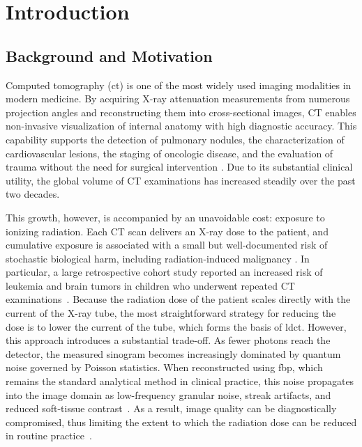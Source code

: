 \chapter{Introduction}
\label{chap:introduction}

\section{Background and Motivation}
\label{sec:intro_motivation}

Computed tomography (\gls{ct}) is one of the most widely used imaging modalities in modern medicine. By acquiring X-ray attenuation measurements from numerous projection angles and reconstructing them into cross-sectional images, CT enables non-invasive visualization of internal anatomy with high diagnostic accuracy. This capability supports the detection of pulmonary nodules, the characterization of cardiovascular lesions, the staging of oncologic disease, and the evaluation of trauma without the need for surgical intervention \cite{Sadia2024, Komolafe2024}. Due to its substantial clinical utility, the global volume of CT examinations has increased steadily over the past two decades.

This growth, however, is accompanied by an unavoidable cost: exposure to ionizing radiation. Each CT scan delivers an X-ray dose to the patient, and cumulative exposure is associated with a small but well-documented risk of stochastic biological harm, including radiation-induced malignancy \cite{Sadia2024, AAPM2016}. In particular, a large retrospective cohort study reported an increased risk of leukemia and brain tumors in children who underwent repeated CT examinations~\cite{Pearce2012}. Because the radiation dose of the patient scales directly with the current of the X-ray tube, the most straightforward strategy for reducing the dose is to lower the current of the tube, which forms the basis of \gls{ldct}. However, this approach introduces a substantial trade-off. As fewer photons reach the detector, the measured sinogram becomes increasingly dominated by quantum noise governed by Poisson statistics. When reconstructed using \gls{fbp}, which remains the standard analytical method in clinical practice, this noise propagates into the image domain as low-frequency granular noise, streak artifacts, and reduced soft-tissue contrast~\cite{Leuschner2021}. As a result, image quality can be diagnostically compromised, thus limiting the extent to which the radiation dose can be reduced in routine practice~\cite{AAPM2016}.

